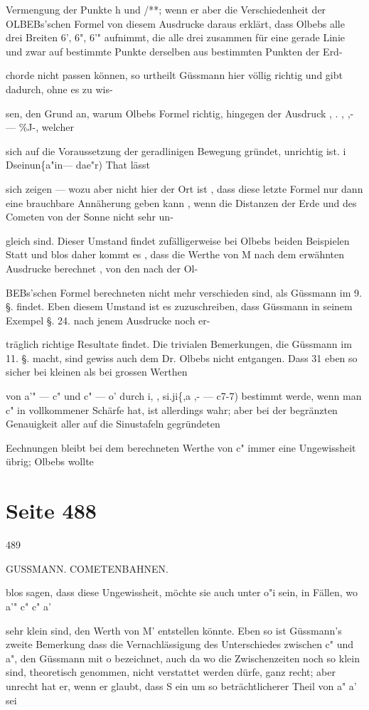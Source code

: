 \documentclass[10pt,a4paper]{article}
\begin{document}
Vermengung der Punkte h und /**; wenn er aber die Verschiedenheit der OLBEBs'schen Formel von diesem Ausdrucke daraus erklärt, dass Olbebs alle drei Breiten 6', 6", 6'" aufnimmt, die alle drei zusammen für eine gerade Linie und zwar auf bestimmte Punkte derselben aus bestimmten Punkten der Erd-

chorde nicht passen können, so urtheilt Güssmann hier völlig richtig und gibt dadurch, ohne es zu wis-

sen, den Grund an, warum Olbebs Formel richtig, hingegen der Ausdruck , . , ,- — \%J-, welcher

sich auf die Voraussetzung der geradlinigen Bewegung gründet, unrichtig ist. i Dseinun\{a"in— dae"r) That lässt

sich zeigen — wozu aber nicht hier der Ort ist , dass diese letzte Formel nur dann eine brauchbare Annäherung geben kann , wenn die Distanzen der Erde und des Cometen von der Sonne nicht sehr un-

gleich sind. Dieser Umstand findet zufälligerweise bei Olbebs beiden Beispielen Statt und blos daher kommt es , dass die Werthe von M nach dem erwähnten Ausdrucke berechnet , von den nach der Ol-

BEBs'schen Formel berechneten nicht mehr verschieden sind, als Güssmann im 9. §. findet. Eben diesem Umstand ist es zuzuschreiben, dass Güssmann in seinem Exempel §. 24. nach jenem Ausdrucke noch er-

träglich richtige Resultate findet. Die trivialen Bemerkungen, die Güssmann im 11. §. macht, sind gewiss auch dem Dr. Olbebs nicht entgangen. Dass 31 eben so sicher bei kleinen als bei grossen Werthen

von a'" — c" und c" — o' durch i, , si.ji\{,a ,- — c7-7) bestimmt werde, wenn man c" in vollkommener Schärfe hat, ist allerdings wahr; aber bei der begränzten Genauigkeit aller auf die Sinustafeln gegründeten

Eechnungen bleibt bei dem berechneten Werthe von c" immer eine Ungewissheit übrig; Olbebs wollte


\newpage
\section*{Seite 488}
489

GUSSMANN. COMETENBAHNEN.

blos sagen, dass diese Ungewissheit, möchte sie auch unter o"i sein, in Fällen, wo a'" c" c" a'

sehr klein sind, den Werth von M' entstellen könnte. Eben so ist Güssmann's zweite Bemerkung dass die Vernachlässigung des Unterschiedes zwischen c" und a", den Güssmann mit o bezeichnet, auch da wo die Zwischenzeiten noch so klein sind, theoretisch genommen, nicht verstattet werden dürfe, ganz recht; aber unrecht hat er, wenn er glaubt, dass S ein um so beträchtlicherer Theil von a" a' sei
\end{document}
